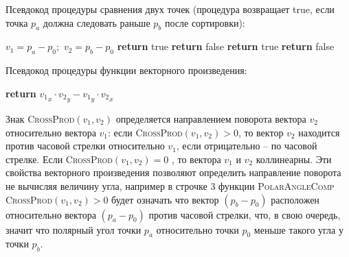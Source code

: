 \newpage

\noindent Псевдокод процедуры сравнения двух точек (процедура возвращает true, если точка $p_a$ должна следовать раньше $p_b$ после сортировки):
\begin{algorithmic}[1]
		\State $v_1 = p_a - p_0;$ $v_2 = p_b - p_0$
			\State \textbf{return} true
			\State \textbf{return} false
		\Else
				\State \textbf{return} true
			\Else
				\State \textbf{return} false
			\EndIf
		\EndIf
	\EndProcedure
\end{algorithmic}

\noindent Псевдокод процедуры функции векторного произведения:
\begin{algorithmic}[1]
		\State \textbf{return} ${v_1}_x \cdot {v_2}_y - {v_1}_y \cdot {v_2}_x$
	\EndProcedure
\end{algorithmic}

Знак \textsc{CrossProd}$(v_1, v_2)$ определяется направлением поворота вектора $v_2$ относительно вектора $v_1$: если \textsc{CrossProd}$(v_1, v_2) > 0$, то вектор $v_2$ находится против часовой стрелки относительно $v_1$, если отрицательно -- по часовой стрелке. Если \textsc{CrossProd}$(v_1, v_2)=0$ , то вектора $v_1$ и $v_2$ коллинеарны. Эти свойства векторного произведения позволяют определить направление поворота не вычисляя величину угла, например в строчке 3 функции \textsc{PolarAngleComp} \textsc{CrossProd}$(v_1, v_2) > 0$ будет означать что вектор $(p_b-p_0)$ расположен относительно вектора $(p_a-p_0)$ против часовой стрелки, что, в свою очередь, значит что полярный угол точки $p_a$ относительно точки $p_0$ меньше такого угла у точки $p_b$\footnotemark{}.


\newpage

